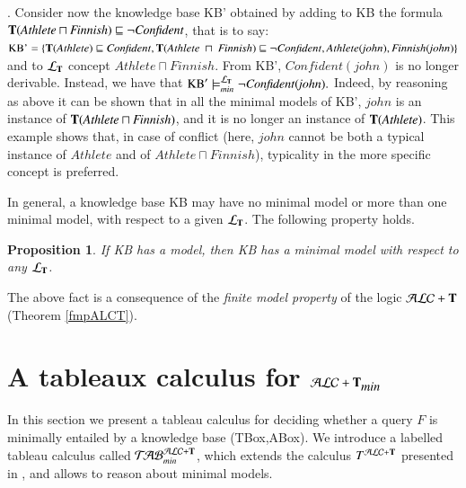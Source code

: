 \documentclass[a4paper, 11pt, oneside]{elsarticle}
\newcommand{\tip}{{\bf T}}
\newcommand{\alct}{\mathcal{ALC}+\tip}
\newcommand{\alctmin}{\mathcal{ALC}+\tip_{\mbox{\em min}}}
\newcommand{\sqset}{\sqsubseteq}
\newcommand{\mint}{\sqcap}
\newcommand{\ellet} {\mathcal{L}_{\bf T}}
\newcommand{\nuovoc}{\mathrel{{\mathcal{T}\!\mathcal{AB}}}_{min}^{\mathcal{ALC}+\mbox{\scriptsize $\tip$}}}
\newcommand{\calcolo}{T^{\mathcal{ALC}+\mbox{\scriptsize $\tip$}}}
\newtheorem{proposition}{Proposition}
\newcounter{posu}
\newtheorem{proposition}[posu]{Proposition}
\begin{document}
. Consider now the knowledge base KB' obtained by adding to KB the formula $\tip(\mathit{Athlete} \mint \mathit{Finnish}) \sqsubseteq \neg \mathit{Confident}$, that is to say:
$\mbox{KB'}  = \{ \tip(\mathit{Athlete}) \sqset \mathit{Confident}, \tip(\mathit{Athlete} \ \mint \ \mathit{Finnish}) \sqsubseteq \neg \mathit{Confident}, \mathit{Athlete}(\mathit{john}), \mathit{Finnish}(\mathit{john})\}$ and to ${\ellet}$ concept $\mathit{Athlete} \mint \mathit{Finnish}$.
From KB', $\mathit{Confident}(\mathit{john})$ is no longer derivable.
Instead, we have that $\mbox{KB}' \models_{min}^{\ellet} \neg \mathit{Confident}(\mathit{john}).$ Indeed, by reasoning as above it can be shown that in all the minimal models of KB', $\mathit{john}$ is an instance of $\tip(\mathit{Athlete} \mint \mathit{Finnish})$, and it is no longer an instance of $\tip(\mathit{Athlete})$.
This example shows that, in case of conflict (here, $\mathit{john}$ cannot be both a typical instance of $\mathit{Athlete}$ and of $\mathit{Athlete} \mint \mathit{Finnish}$), typicality in the more specific concept is preferred.

\vspace{0.35cm}

\noindent In general, a knowledge base KB may have no minimal model or more than one minimal model, with respect to a given $\ellet$. The following property holds.

\begin{proposition}\label{proprModMinimali1}
If \emph{KB} has a model, then \emph{KB} has a minimal model with respect to any $\ellet$.
\end{proposition}

The above fact  is  a consequence of the \emph{finite model property} of the logic $\alct$ (Theorem \ref{fmpALCT}).




\section{A tableaux calculus for $\alctmin$}\label{tab}

In this section we present a tableau calculus for deciding whether a query $F$ is minimally entailed by a knowledge base (TBox,ABox).
We introduce a labelled tableau calculus  called $\nuovoc$, which extends the calculus $\calcolo$ presented in \cite{FI09}, and allows to reason about minimal models.
\end{document}
